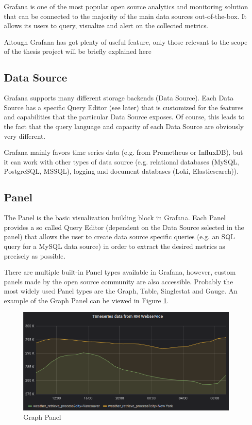Grafana is one of the most popular open source analytics and monitoring solution that can be connected to the majority of the main data sources out-of-the-box. It allows its users to query, visualize and alert on the collected metrics. 

Altough Grafana has got plenty of useful feature, only those relevant to the scope of the thesis project will be briefly explained here


\subsection{Data Source}

Grafana supports many different storage backends (Data Source). Each Data Source has a specific Query Editor (see later) that is customized for the features and capabilities that the particular Data Source exposes. Of course, this leads to the fact that the query language and capacity of each Data Source are obviously very different.

Grafana mainly favors time series data (e.g. from Prometheus or InfluxDB), but it can work with other types of data source (e.g. relational databases (MySQL, PostgreSQL, MSSQL), logging and document databases (Loki, Elasticsearch)).

\subsection{Panel}

The Panel is the basic visualization building block in Grafana. Each Panel provides a so called Query Editor (dependent on the Data Source selected in the panel) that allows the user to create data source specific queries (e.g. an SQL query for a MySQL data source) in order to extract the desired metrics as precisely as possible.

There are multiple built-in Panel types available in Grafana, however, custom panels made by the open source community are also accessible. Probably the most widely used Panel types are the Graph, Table, Singlestat and Gauge. An example of the Graph Panel can be viewed in Figure \ref{fig:graph-panel}.

\begin{figure}[h]
	\centering
	\includegraphics[width=130mm, keepaspectratio]{figures/graph-panel-medium.png}
	\caption{Graph Panel}
	\label{fig:graph-panel}
\end{figure}

